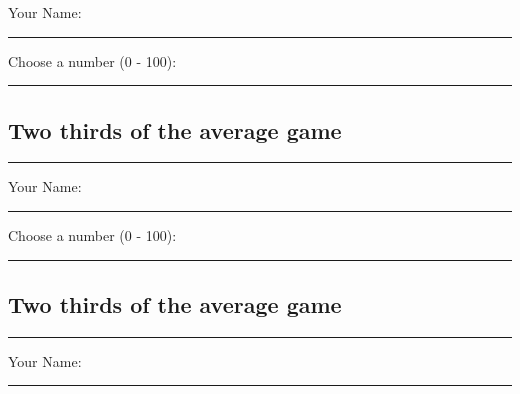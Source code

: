 \documentclass{article}
\begin{document}
\vspace{10mm}

Your Name:

\vspace{3mm}

\hrule

\vspace{10mm}

Choose a number (0 - 100):

\vspace{3mm}

\hrule




\newpage
\thispagestyle{empty}






\begin{center}
    \section*{Two thirds of the average game}
    \rule{0.5\textwidth}{.4pt}
\end{center}

\vspace{10mm}

Your Name:

\vspace{3mm}

\hrule

\vspace{10mm}

Choose a number (0 - 100):

\vspace{3mm}

\hrule






\vspace{20mm}

\begin{center}
    \section*{Two thirds of the average game}
    \rule{0.5\textwidth}{.4pt}
\end{center}

\vspace{10mm}

Your Name:

\vspace{3mm}

\hrule
\end{document}
